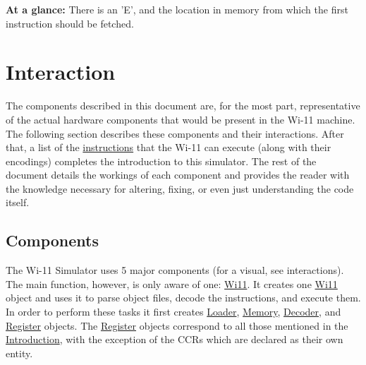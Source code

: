 \begin{DoxyParagraph}{}
{\bfseries At a glance:} There is an 'E', and the location in memory from which the first instruction should be fetched.
\end{DoxyParagraph}
\hypertarget{index_Component}{}\section{Interaction}\label{index_Component}
The components described in this document are, for the most part, representative of the actual hardware components that would be present in the Wi-\/11 machine. The following section describes these components and their interactions. After that, a list of the \hyperlink{index_instructions}{instructions} that the Wi-\/11 can execute (along with their encodings) completes the introduction to this simulator. The rest of the document details the workings of each component and provides the reader with the knowledge necessary for altering, fixing, or even just understanding the code itself.\hypertarget{index_components}{}\subsection{Components}\label{index_components}
The Wi-\/11 Simulator uses 5 major components (for a visual, see interactions). The main function, however, is only aware of one: \hyperlink{classWi11}{Wi11}. It creates one \hyperlink{classWi11}{Wi11} object and uses it to parse object files, decode the instructions, and execute them. In order to perform these tasks it first creates \hyperlink{classLoader}{Loader}, \hyperlink{classMemory}{Memory}, \hyperlink{classDecoder}{Decoder}, and \hyperlink{classRegister}{Register} objects. The \hyperlink{classRegister}{Register} objects correspond to all those mentioned in the \hyperlink{index_intro}{Introduction}, with the exception of the CCRs which are declared as their own entity.

